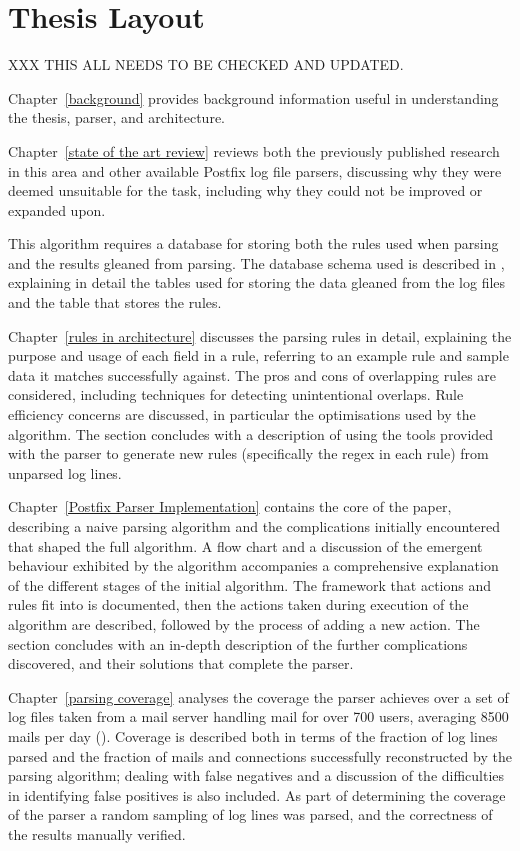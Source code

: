 \section{Thesis Layout}

XXX THIS ALL NEEDS TO BE CHECKED AND UPDATED\@.

Chapter~\ref{background} provides background information useful in
understanding the thesis, parser, and architecture.

Chapter~\ref{state of the art review} reviews both the previously published
research in this area and other available Postfix log file parsers,
discussing why they were deemed unsuitable for the task, including why they
could not be improved or expanded upon.

This algorithm requires a database for storing both the rules used when
parsing and the results gleaned from parsing.  The database schema used is
described in , explaining in detail the tables
used for storing the data gleaned from the log files and the table that
stores the rules.

Chapter~\ref{rules in architecture} discusses the parsing rules in detail,
explaining the purpose and usage of each field in a rule, referring to an
example rule and sample data it matches successfully against.  The pros and
cons of overlapping rules are considered, including techniques for
detecting unintentional overlaps.  Rule efficiency concerns are discussed,
in particular the optimisations used by the algorithm.  The section
concludes with a description of using the tools provided with the parser to
generate new rules (specifically the regex in each rule) from unparsed log
lines.

Chapter~\ref{Postfix Parser Implementation} contains the core of the paper,
describing a naive parsing algorithm and the complications initially
encountered that shaped the full algorithm.  A flow chart and a discussion
of the emergent behaviour exhibited by the algorithm accompanies a
comprehensive explanation of the different stages of the initial algorithm.
The framework that actions and rules fit into is documented, then the
actions taken during execution of the algorithm are described, followed by
the process of adding a new action.  The section concludes with an in-depth
description of the further complications discovered, and their solutions
that complete the parser.

Chapter~\ref{parsing coverage} analyses the coverage the parser achieves
over a set of \numberOFlogFILES{} log files taken from a mail server
handling mail for over 700 users, averaging 8500 mails per day
().  Coverage is described both
in terms of the fraction of log lines parsed and the fraction of mails and
connections successfully reconstructed by the parsing algorithm; dealing
with false negatives and a discussion of the difficulties in identifying
false positives is also included.  As part of determining the coverage of
the parser a random sampling of log lines was parsed, and the correctness
of the results manually verified.

